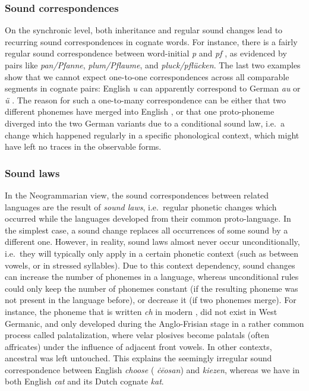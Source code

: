 \subsubsection{Sound correspondences}
On the synchronic level, both inheritance and regular sound changes lead to recurring sound correspondences in cognate words. For instance, there is a fairly regular sound correspondence between word-initial  \textit{p} \ipa{[p\textsuperscript{h}]} and  \textit{pf} \ipa{[\t{pf}]}, as evidenced by pairs like \textit{pan/Pfanne}, \textit{plum/Pflaume}, and \textit{pluck/pflücken}. The last two examples show that we cannot expect one-to-one correspondences across all comparable segments in cognate pairs: English \textit{u} \ipa{[2]} can apparently correspond to German \textit{au} \ipa{[A\textsubarch{U}]} or \textit{ü} \ipa{[Y]}. The reason for such a one-to-many correspondence can be either that two different phonemes have merged into English \ipa{[2]}, or that one proto-phoneme diverged into the two German variants due to a conditional sound law, i.e.\ a change which happened regularly in a specific phonological context, which might have left no traces in the observable forms.

\subsubsection{Sound laws}
In the Neogrammarian view, the sound correspondences between related languages are the result of \textit{sound laws}, i.e.\ regular phonetic changes which occurred while the languages developed from their common proto-language. In the simplest case, a sound change replaces all occurrences of some sound by a different one. However, in reality, sound laws almost never occur unconditionally, i.e.\ they will typically only apply in a certain phonetic context (such as between vowels, or in stressed syllables). Due to this context dependency, sound changes can increase the number of phonemes in a language, whereas unconditional rules could only keep the number of phonemes constant (if the resulting phoneme was not present in the language before), or decrease it (if two phonemes merge). For instance, the phoneme \ipa{[\t{tS}]} that is written \textit{ch} in modern , did not exist in West Germanic, and only developed during the Anglo-Frisian stage in a rather common process called 
palatalization, where velar plosives become palatals (often affricates) under the influence of adjacent front vowels. In other contexts, ancestral \ipa{[k]} was left untouched. This explains the seemingly irregular sound correspondence between English \textit{choose} ( \textit{ċēosan}) and  \textit{kiezen}, whereas we have \ipa{[k]} in both English \textit{cat} and its Dutch cognate \textit{kat}.

